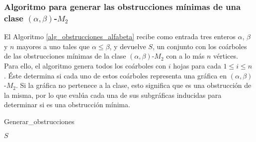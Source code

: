 \subsubsection{Algoritmo para generar las obstrucciones mínimas de una clase $(\alpha,\beta)$-$M_2$}

El Algoritmo \ref{alg_obstrucciones_alfabeta} recibe como entrada tres enteros $\alpha$, $\beta$ y $n$ mayores a uno tales que $\alpha \le \beta$, y devuelve $S$, un conjunto con los coárboles de las obstrucciones mínimas de la clase $(\alpha,\beta)$-$M_2$ con a lo más $n$ vértices. Para ello, el algoritmo genera todos los coárboles con $i$ hojas para cada $1\le i \le n$ \cite{Jones}. Éste determina si cada uno de estos coárboles representa una gráfica en $(\alpha,\beta)$-$M_2$. Si la gráfica no pertenece a la clase, esto significa que es una obstrucción de la misma, por lo que evalúa cada una de sus subgráficas inducidas para determinar si es una obstrucción mínima.

\begin{algorithm}[ht!]
\caption{Generar\_obstrucciones}
\label{alg_obstrucciones_alfabeta}
\DontPrintSemicolon %


\Return $S$\;

\end{algorithm} 